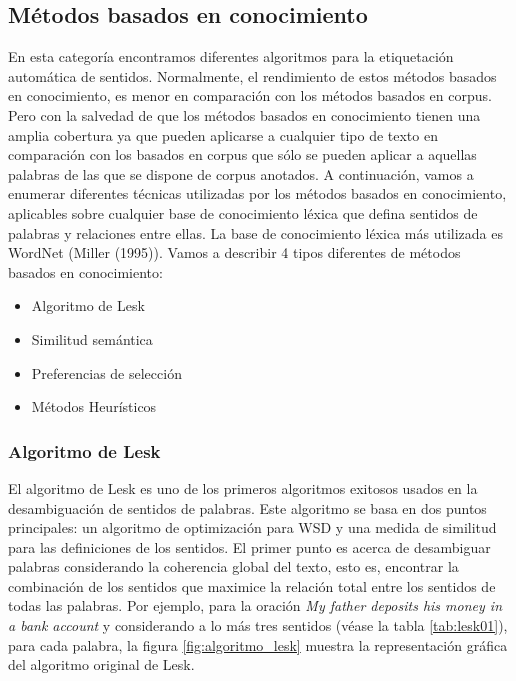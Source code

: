 \subsection{Métodos basados en conocimiento}
En esta categoría encontramos diferentes algoritmos para la etiquetación automática de sentidos. Normalmente, el rendimiento de estos métodos basados en conocimiento, es menor en comparación con los métodos basados en corpus. Pero con la salvedad de que los métodos basados en conocimiento tienen una amplia cobertura ya que pueden aplicarse a cualquier tipo de texto en comparación con los basados en corpus que sólo se pueden aplicar a aquellas palabras de las que se dispone de corpus anotados. A continuación, vamos a enumerar diferentes técnicas utilizadas por los métodos basados en conocimiento, aplicables sobre cualquier base de conocimiento léxica que defina sentidos de palabras y relaciones entre ellas. La base de conocimiento léxica más utilizada es WordNet (Miller (1995)). Vamos a describir 4 tipos diferentes de métodos basados en conocimiento:

\begin{itemize}
  \item Algoritmo de Lesk
  \item Similitud semántica
  \item Preferencias de selección
  \item Métodos Heurísticos
\end{itemize}

\subsubsection{Algoritmo de Lesk}
El algoritmo de Lesk \cite{002} es uno de los primeros algoritmos exitosos usados en la desambiguación de sentidos de palabras. Este algoritmo se basa en dos puntos principales: un algoritmo de optimización para WSD y una medida de similitud para las definiciones de los sentidos.
El primer punto es acerca de desambiguar palabras considerando la coherencia global del texto, esto es, encontrar la combinación de los sentidos que maximice la relación total entre los sentidos de todas las palabras. 
Por ejemplo, para la oración \textit{My father deposits his money in a bank account} y considerando a lo más tres sentidos (véase la tabla \ref{tab:lesk01}), para cada palabra, la figura \ref{fig:algoritmo_lesk} muestra la representación gráfica del algoritmo original de Lesk.

